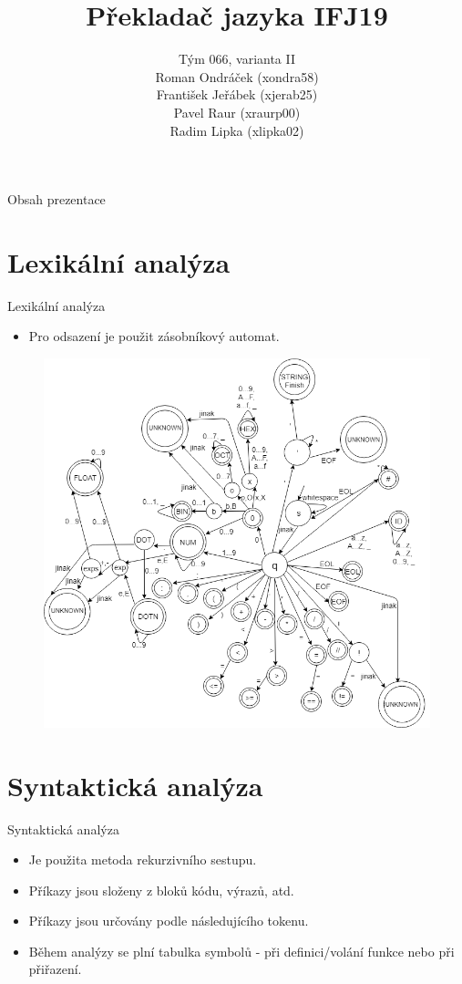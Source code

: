 \documentclass[12pt]{beamer}
\author[Tým 066, varianta II]{{\Large Tým 066, varianta II\\}Roman Ondráček (xondra58)\\František Jeřábek (xjerab25)\\Pavel Raur (xraurp00)\\ Radim Lipka (xlipka02)}
\title{Překladač jazyka IFJ19}
\begin{document}
\begin{frame}
\titlepage
\end{frame}

\begin{frame}{Obsah prezentace}
\tableofcontents
\end{frame}

\section{Lexikální analýza}
\begin{frame}{Lexikální analýza}
\begin{itemize}
\item Pro odsazení je použit zásobníkový automat.
\end{itemize}
\endminipage
{}
\begin{figure}[!htbp]
    \centering
    \includegraphics[width = \textwidth]{img/Lexical_Analysis.png}
\end{figure}
 \endminipage
\end{frame}

\section{Syntaktická analýza}
\begin{frame}{Syntaktická analýza}
\begin{itemize}
\item Je použita metoda rekurzivního sestupu.
\item Příkazy jsou složeny z bloků kódu, výrazů, atd.
\item Příkazy jsou určovány podle následujícího tokenu.
\item Během analýzy se plní tabulka symbolů - při definici/volání funkce nebo při přiřazení.
\end{itemize}
\end{frame}
\end{document}
